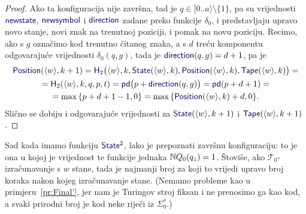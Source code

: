 \begin{proof}
Ako ta konfiguracija nije završna, tad je $q\in[0..a\rangle\setminus\{1\}$, pa su vrijednosti $\f{newstate}$, $\f{newsymbol}$ i $\f{direction}$ zadane preko funkcije $\delta_0$, i predstavljaju upravo novo stanje, novi znak na trenutnoj poziciji, i pomak na novu poziciju. Recimo, ako s $g$ označimo kod trenutno čitanog znaka, a s $d$ treću komponentu odgovarajuće vrijednosti $\delta_0(q,g)$, tada je $\f{direction}(q,g)=d+1$, pa je
\begin{multline}
    \f{Position}(\kr w,k+1)=\f H_2\bigl(\kr w,k,\f{State}(\kr w,k),\f{Position}(\kr w, k),\f{Tape}(\kr w,k)\bigr)=\\
    =\f H_2(\kr w,k,q,p,t)=
    \f{pd}\bigl(p+\f{direction}(q,g)\bigr)=\f{pd}(p+d+1)=\\
    =\max\,\{p+d+1-1,0\}=\max\,\{\f{Position}(\kr w,k)+d,0\}\text.
\end{multline}
Slično se dobiju i odgovarajuće vrijednosti za $\f{State}(\kr w,k+1)$ i $\f{Tape}(\kr w,k+1)$.
\end{proof}


Sad kada imamo funkciju $\f{State}^2$, lako je prepoznati završnu konfiguraciju: to je ona u kojoj je vrijednost te funkcije jednaka ${\mathbb N} Q_0(q_z)=1$. Štoviše, ako $\mathcal T_0$-izračunavanje s $w$ stane, tada je najmanji broj za koji to vrijedi upravo broj koraka nakon kojeg izračunavanje stane. (Nemamo probleme kao u primjeru~\ref{pr:Final'}, jer nam je Turingov stroj fiksan i ne prenosimo ga kao kod, a svaki prirodni broj je kod neke riječi iz $\Sigma_0^*$.)

